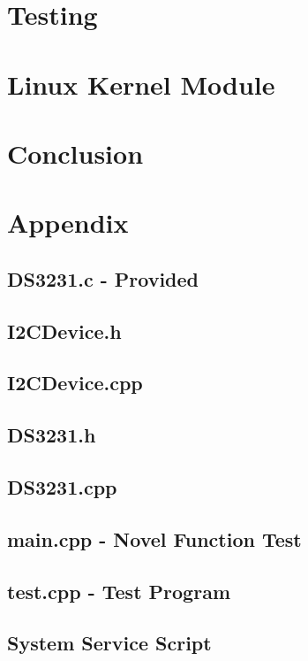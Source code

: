 \documentclass[a4paper 12pt]{article}
\begin{document}
\section{Testing}

\section{Linux Kernel Module}

\section{Conclusion}

\clearpage
\printbibliography
\appendix
\section{Appendix}
\subsection{DS3231.c - Provided}

\subsection{I2CDevice.h}

\subsection{I2CDevice.cpp}

\subsection{DS3231.h}

\subsection{DS3231.cpp}

\subsection{main.cpp - Novel Function Test}

\subsection{test.cpp - Test Program}

\subsection{System Service Script}

\end{document}
